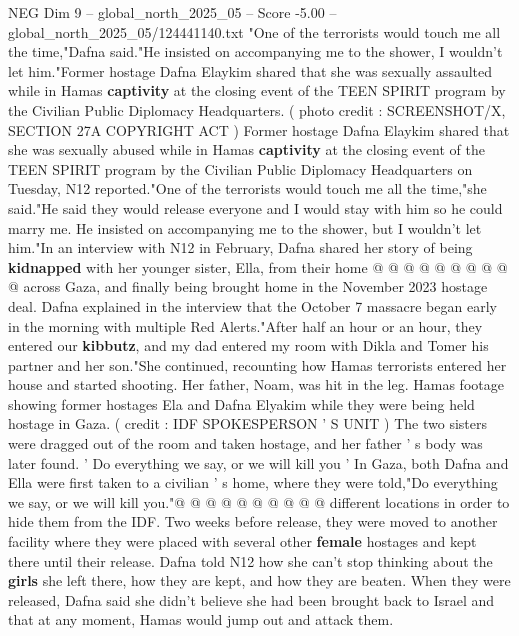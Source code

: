 \begin{textsample}{NEG Dim 9 – global\_north\_2025\_05 – Score -5.00 – global\_north\_2025\_05/124441140.txt}  \label{ex:f9_neg_180}
"One of the terrorists would touch me all the time,"Dafna said."He insisted on accompanying me to the shower, I wouldn't let him."Former hostage Dafna Elaykim shared that she was sexually assaulted while in Hamas \textbf{captivity} at the closing event of the TEEN SPIRIT program by the Civilian Public Diplomacy Headquarters. ( photo credit : SCREENSHOT/X, SECTION 27A COPYRIGHT ACT ) Former hostage Dafna Elaykim shared that she was sexually abused while in Hamas \textbf{captivity} at the closing event of the TEEN SPIRIT program by the Civilian Public Diplomacy Headquarters on Tuesday, N12 reported."One of the terrorists would touch me all the time,"she said."He said they would release everyone and I would stay with him so he could marry me.
He insisted on accompanying me to the shower, but I wouldn't let him."In an interview with N12 in February, Dafna shared her story of being \textbf{kidnapped} with her younger sister, Ella, from their home @ @ @ @ @ @ @ @ @ @ across Gaza, and finally being brought home in the November 2023 hostage deal.
Dafna explained in the interview that the October 7 massacre began early in the morning with multiple Red Alerts."After half an hour or an hour, they entered our \textbf{kibbutz}, and my dad entered my room with Dikla and Tomer his partner and her son."She continued, recounting how Hamas terrorists entered her house and started shooting.
Her father, Noam, was hit in the leg.
Hamas footage showing former hostages Ela and Dafna Elyakim while they were being held hostage in Gaza. ( credit : IDF SPOKESPERSON ' S UNIT ) The two sisters were dragged out of the room and taken hostage, and her father ' s body was later found. ' Do everything we say, or we will kill you ' In Gaza, both Dafna and Ella were first taken to a civilian ' s home, where they were told,"Do everything we say, or we will kill you."@ @ @ @ @ @ @ @ @ @ different locations in order to hide them from the IDF.
Two weeks before release, they were moved to another facility where they were placed with several other \textbf{female} hostages and kept there until their release.
Dafna told N12 how she can't stop thinking about the \textbf{girls} she left there, how they are kept, and how they are beaten.
When they were released, Dafna said she didn't believe she had been brought back to Israel and that at any moment, Hamas would jump out and attack them.

\end{textsample}
